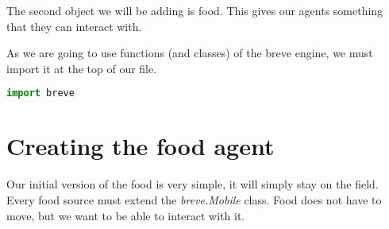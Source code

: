 The second object we will be adding is food. This gives our agents something that they can interact with.


As we are going to use functions (and classes) of the breve engine, we must import it at the top of our file.

\begin{lstlisting}[language=Python]
import breve
\end{lstlisting}

\section{Creating the food agent}

Our initial version of the food is very simple, it will simply stay on the field. Every food source must extend the \textit{breve.Mobile} class. Food does not have to move, but we want to be able to interact with it.